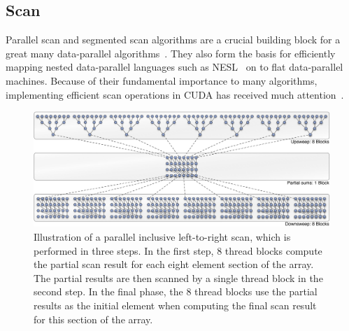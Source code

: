 \subsection{Scan}
\label{sec:parallel_scan}

Parallel scan and segmented scan algorithms are a crucial building block for a
great many data-parallel algorithms~\cite{Blelloch:1990ts,Chatterjee:1990vj}.
They also form the basis for efficiently mapping nested data-parallel languages
such as NESL~\cite{Blelloch:1995ut,Blelloch:1996jx} on to flat data-parallel
machines. Because of their fundamental importance to many algorithms,
implementing efficient scan operations in CUDA\cuda{} has received much
attention~\cite{Sengupta:2007tc,Sengupta:2008ut,Dotsenko:2008fo,Merrill:2009un,Harris:2012fy}.

\begin{figure}
    \begin{center}
        \includegraphics[width=\textwidth]{images/basics/scan}
    \end{center}
    \caption[A parallel inclusive scan]{Illustration of a parallel inclusive
        left-to-right scan, which is performed in three steps. In the first
        step, 8 thread blocks compute the partial scan result for each eight
        element section of the array. The partial results are then scanned by a
        single thread block in the second step. In the final phase, the 8 thread
        blocks use the partial results as the initial element when computing the
        final scan result for this section of the array.}
    \label{fig:fast_scan}
\end{figure}

